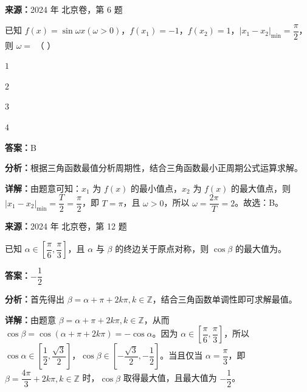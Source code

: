 \begin{question}[points=4]
\textbf{来源：}2024 年 北京卷，第 6 题\par
已知 $f(x)=\sin\omega x(\omega>0)$，$f(x_1)=-1$，$f(x_2)=1$，$|x_1-x_2|_{\min}=\dfrac{\pi}{2}$，则 $\omega=$ （ ）
\begin{choices}
  \item $1$
  \item $2$
  \item $3$
  \item $4$
\end{choices}
\begin{solution}
\textbf{答案：}B

\textbf{分析：}根据三角函数最值分析周期性，结合三角函数最小正周期公式运算求解。

\textbf{详解：}由题意可知：$x_1$ 为 $f(x)$ 的最小值点，$x_2$ 为 $f(x)$ 的最大值点，则 $|x_1-x_2|_{\min}=\dfrac{T}{2}=\dfrac{\pi}{2}$，即 $T=\pi$，且 $\omega>0$，所以 $\omega=\dfrac{2\pi}{T}=2$。故选：B。
\end{solution}
\end{question}

\begin{question}[points=5]
\textbf{来源：}2024 年 北京卷，第 12 题\par
已知 $\alpha \in \left[\dfrac{\pi}{6},\dfrac{\pi}{3}\right]$，且 $\alpha$ 与 $\beta$ 的终边关于原点对称，则 $\cos \beta$ 的最大值为。
\fillin[{$-\dfrac{1}{2}$}]
\begin{solution}
\textbf{答案：}$-\dfrac{1}{2}$

\textbf{分析：}首先得出 $\beta = \alpha + \pi + 2k\pi, k \in \mathbb{Z}$，结合三角函数单调性即可求解最值。

\textbf{详解：}由题意 $\beta = \alpha + \pi + 2k\pi, k \in \mathbb{Z}$，从而 $\cos \beta = \cos(\alpha+\pi+2k\pi) = -\cos \alpha$。因为 $\alpha \in [\dfrac{\pi}{6},\dfrac{\pi}{3}]$，所以 $\cos \alpha \in [\dfrac{1}{2},\dfrac{\sqrt{3}}{2}]$，$\cos \beta \in [-\dfrac{\sqrt{3}}{2},-\dfrac{1}{2}]$。当且仅当 $\alpha = \dfrac{\pi}{3}$，即 $\beta = \dfrac{4\pi}{3} + 2k\pi, k \in \mathbb{Z}$ 时，$\cos \beta$ 取得最大值，且最大值为 $-\dfrac{1}{2}$。
\end{solution}
\end{question}

